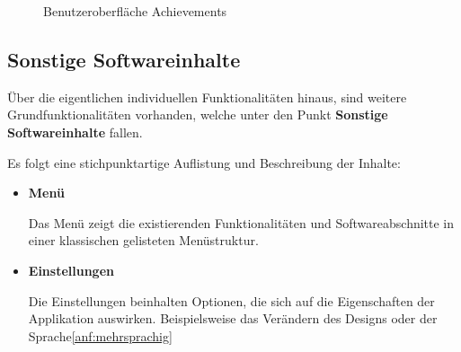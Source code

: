 \documentclass[bibliography=totoc,listof=totoc,BCOR=5mm,DIV=12,oneside]{scrbook}
\begin{document}
\begin{figure}[H]
\centering
	\caption{Benutzeroberfläche Achievements}
	\label{img:achievements}
\end{figure}

\newpage
\subsection{Sonstige Softwareinhalte}
\par Über die eigentlichen individuellen Funktionalitäten hinaus, sind weitere Grundfunktionalitäten vorhanden, welche unter den Punkt \textbf{Sonstige Softwareinhalte} fallen.

\par\medskip Es folgt eine stichpunktartige Auflistung und Beschreibung der Inhalte:
\begin{itemize}
\item \textbf{Menü}
\par Das Menü zeigt die existierenden Funktionalitäten und Softwareabschnitte in einer klassischen gelisteten Menüstruktur.
\item \textbf{Einstellungen}
\par Die Einstellungen beinhalten Optionen, die sich auf die Eigenschaften der Applikation auswirken. Beispielsweise das Verändern des Designs oder der Sprache\ref{anf:mehrsprachig}
\end{itemize}
\end{document}
